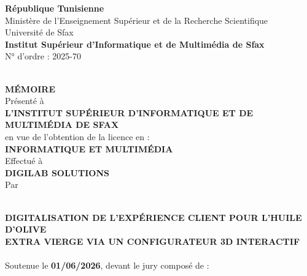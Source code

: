 \begin{titlepage}
\begin{center}

\textbf{République Tunisienne}\\[0.2cm]
Ministère de l'Enseignement Supérieur et de la Recherche Scientifique\\[0.1cm]
Université de Sfax\\[0.3cm]
\textbf{Institut Supérieur d'Informatique et de Multimédia de Sfax}\\[0.2cm]
\textcolor{gris}{\small N° d'ordre : 2025-70}

\vspace{0.8cm}
\textcolor{or}{\HRule}\\[0.4cm]


\vspace{0.5cm}
{\Large \textbf{MÉMOIRE}}\\[0.2cm]
{\normalsize Présenté à}\\[0.2cm]
{\large \textbf{L'INSTITUT SUPÉRIEUR D'INFORMATIQUE ET DE MULTIMÉDIA DE SFAX}}\\[0.3cm]
{\normalsize en vue de l'obtention de la licence en :}\\[0.2cm]
{\large \textbf{INFORMATIQUE ET MULTIMÉDIA}}\\[0.4cm]
{\normalsize Effectué à}\\[0.2cm]
{\large \textbf{DIGILAB SOLUTIONS}}\\[0.4cm]
{\normalsize Par}\\[0.2cm]
{\Large \textbf{\NomEtudiant}}

\vspace{0.6cm}
\textcolor{or}{\HRule}\\[0.4cm]

{
  \Large\bfseries\color{marron}
  DIGITALISATION DE L'EXPÉRIENCE CLIENT POUR L'HUILE D'OLIVE\\
  EXTRA VIERGE VIA UN CONFIGURATEUR 3D INTERACTIF
}\\[0.2cm]

\textcolor{or}{\HRule}\\[1cm]

{\normalsize Soutenue le \textbf{01/06/2026}, devant le jury composé de :}\\[0.5cm]


\end{center}
\end{titlepage}

